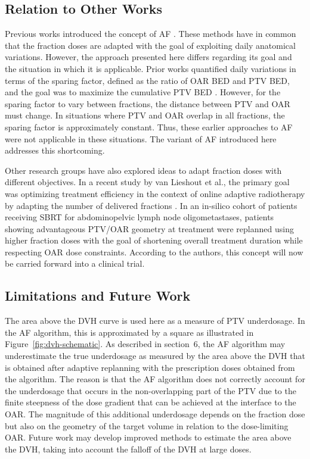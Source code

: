 \documentclass[11pt]{article}
\begin{document}
\subsection{Relation to Other Works}

Previous works introduced the concept of AF \cite{ref10,ref11,ref12,ref13}. These methods have in common that the fraction doses are adapted with the goal of exploiting daily anatomical variations. However, the approach presented here differs regarding its goal and the situation in which it is applicable. Prior works quantified daily variations in terms of the sparing factor, defined as the ratio of OAR BED and PTV BED, and the goal was to maximize the cumulative PTV BED \cite{ref13}. However, for the sparing factor to vary between fractions, the distance between PTV and OAR must change. In situations where PTV and OAR overlap in all fractions, the sparing factor is approximately constant. Thus, these earlier approaches to AF were not applicable in these situations. The variant of AF introduced here addresses this shortcoming.

Other research groups have also explored ideas to adapt fraction doses with different objectives. In a recent study by van Lieshout et al., the primary goal was optimizing treatment efficiency in the context of online adaptive radiotherapy by adapting the number of delivered fractions \cite{ref15}. In an in-silico cohort of patients receiving SBRT for abdominopelvic lymph node oligometastases, patients showing advantageous PTV/OAR geometry at treatment were replanned using higher fraction doses with the goal of shortening overall treatment duration while respecting OAR dose constraints. According to the authors, this concept will now be carried forward into a clinical trial.

\subsection{Limitations and Future Work}

The area above the DVH curve is used here as a measure of PTV underdosage. In the AF algorithm, this is approximated by a square as illustrated in Figure~\ref{fig:dvh-schematic}. As described in section~6, the AF algorithm may underestimate the true underdosage as measured by the area above the DVH that is obtained after adaptive replanning with the prescription doses obtained from the algorithm. The reason is that the AF algorithm does not correctly account for the underdosage that occurs in the non-overlapping part of the PTV due to the finite steepness of the dose gradient that can be achieved at the interface to the OAR. The magnitude of this additional underdosage depends on the fraction dose but also on the geometry of the target volume in relation to the dose-limiting OAR. Future work may develop improved methods to estimate the area above the DVH, taking into account the falloff of the DVH at large doses.
\end{document}
